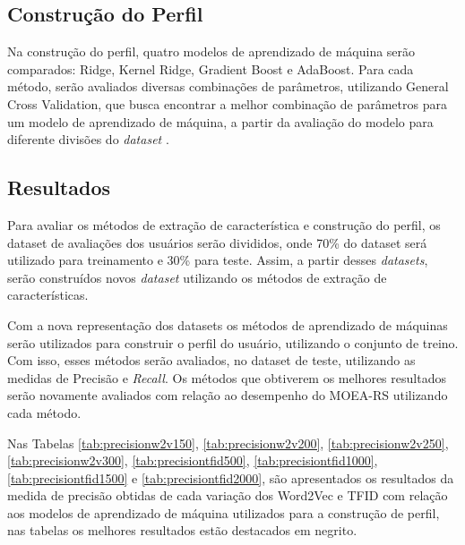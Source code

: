 \subsection{Construção do Perfil}
Na construção do perfil, quatro modelos de aprendizado  de máquina serão comparados: Ridge, Kernel Ridge, Gradient Boost e AdaBoost. Para cada método, serão avaliados diversas combinações de parâmetros, utilizando General Cross Validation, que busca  encontrar a melhor combinação de  parâmetros para um modelo de aprendizado de máquina, a partir da avaliação do modelo para diferente divisões do \textit{dataset} \cite{kohavi1995study}.
\
\subsection{Resultados}
Para avaliar os métodos de extração de característica e construção do perfil, os dataset de avaliações dos usuários serão divididos, onde 70\% do dataset será utilizado para treinamento e 30\% para teste. Assim, a partir desses \textit{datasets}, serão construídos novos \textit{
dataset} utilizando os métodos de extração de características.

Com a nova representação  dos datasets os métodos de aprendizado de máquinas serão utilizados para construir o perfil do usuário, utilizando o conjunto de treino. Com isso, esses métodos serão avaliados, no dataset de teste, utilizando as medidas de Precisão e \textit{Recall}. Os métodos que obtiverem os melhores resultados serão novamente avaliados com relação ao desempenho do MOEA-RS utilizando cada método.

Nas Tabelas \ref{tab:precisionw2v150}, \ref{tab:precisionw2v200}, \ref{tab:precisionw2v250}, \ref{tab:precisionw2v300}, \ref{tab:precisiontfid500}, \ref{tab:precisiontfid1000}, \ref{tab:precisiontfid1500} e \ref{tab:precisiontfid2000}, são apresentados os resultados da medida de precisão obtidas de cada variação dos Word2Vec e TFID com relação aos modelos de aprendizado de máquina utilizados para a construção de perfil, nas tabelas os melhores resultados estão destacados em negrito.

